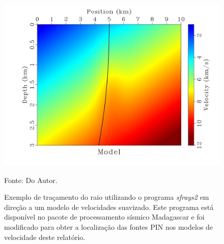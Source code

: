 \begin{figure}[H]
\caption{Exemplo de traçamento do raio utilizando o programa \textit{sfrays2}
em direção a um modelo de velocidades suavizado.
Este programa está disponível no pacote de processamento sísmico Madagascar e foi
modificado para obter a localização das fontes PIN nos modelos de velocidade deste relatório.}
\begin{center}
\includegraphics[scale=0.3]{images/raiomodelo.jpg}
\vspace{-0.3cm}
\end{center}
\begin{center}
 Fonte: Do Autor.
\end{center}
\label{fig:9.6}
\end{figure}

